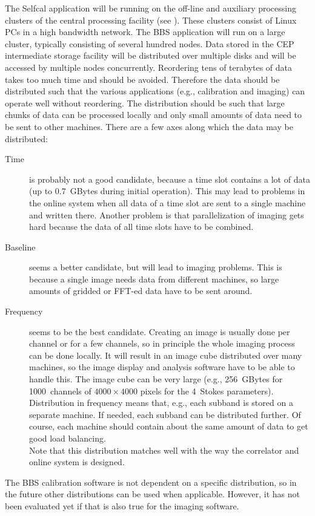 \documentclass[10pt]{lofar}
\begin{document}
The Selfcal application will be running on the off-line and auxiliary
processing clusters of the central processing facility (see
\cite{LOFAR-ASTRON-ADD-012}). These clusters consist of Linux PCs in a high
bandwidth network. The BBS application will run on a large cluster, typically
consisting of several hundred nodes. Data stored in the CEP intermediate
storage facility will be distributed over multiple disks and will be accessed
by multiple nodes concurrently. Reordering tens of terabytes of data takes too
much time and should be avoided.  Therefore the data should be distributed
such that the various applications (e.g., calibration and imaging) can operate
well without reordering. The distribution should be such that large chunks of
data can be processed locally and only small amounts of data need to be sent
to other machines. There are a few axes along which the data may be
distributed:
\begin{description}
\item [Time] is probably not a good candidate, because a time slot contains a
lot of data (up to 0.7~GBytes during initial operation). This may lead to
problems in the online system when all data of a time slot are sent to a
single machine and written there. Another problem is that parallelization of
imaging gets hard because the data of all time slots have to be combined.
\item [Baseline] seems a better candidate, but will lead to imaging problems. 
This is because a single image needs data from different machines, so large
amounts of gridded or FFT-ed data have to be sent around.
\item [Frequency] seems to be the best candidate. Creating an image is usually
done per channel or for a few channels, so in principle the whole imaging
process can be done locally. It will result in an image cube distributed over
many machines, so the image display and analysis software have to be able to
handle this. The image cube can be very large (e.g., 256~GBytes for
1000~channels of $4000 \times 4000$ pixels for the 4~Stokes parameters). \\
Distribution in frequency means that, e.g., each subband is stored on a
separate machine.  If needed, each subband can be distributed further. Of
course, each machine should contain about the same amount of data to get good
load balancing. \\ 
Note that this distribution matches well with the way the
correlator and online system is designed.
\end{description}
The BBS calibration software is not dependent on a specific distribution, so
in the future other distributions can be used when applicable. However, it has
not been evaluated yet if that is also true for the imaging software.
\end{document}
